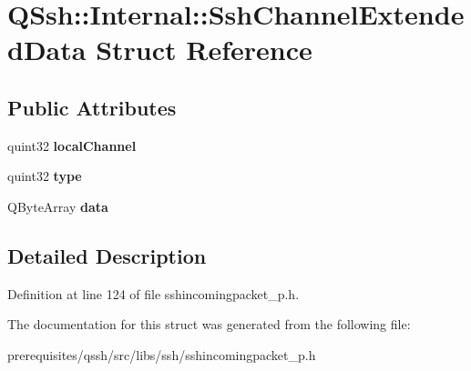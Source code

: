 \hypertarget{struct_q_ssh_1_1_internal_1_1_ssh_channel_extended_data}{}\section{Q\+Ssh\+:\+:Internal\+:\+:Ssh\+Channel\+Extended\+Data Struct Reference}
\label{struct_q_ssh_1_1_internal_1_1_ssh_channel_extended_data}
\subsection*{Public Attributes}
\begin{DoxyCompactItemize}
\item 
\mbox{\label{struct_q_ssh_1_1_internal_1_1_ssh_channel_extended_data_af991e353531642d46ac866d734880999}} 
quint32 {\bfseries local\+Channel}
\item 
\mbox{\label{struct_q_ssh_1_1_internal_1_1_ssh_channel_extended_data_ab89a2bcd8be4b5f54382b564937463bf}} 
quint32 {\bfseries type}
\item 
\mbox{\label{struct_q_ssh_1_1_internal_1_1_ssh_channel_extended_data_adc7528633968691171232dd02b652641}} 
Q\+Byte\+Array {\bfseries data}
\end{DoxyCompactItemize}


\subsection{Detailed Description}


Definition at line 124 of file sshincomingpacket\+\_\+p.\+h.



The documentation for this struct was generated from the following file\+:\begin{DoxyCompactItemize}
\item 
prerequisites/qssh/src/libs/ssh/sshincomingpacket\+\_\+p.\+h\end{DoxyCompactItemize}
